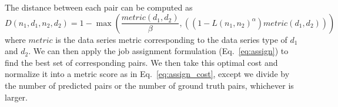\documentclass[a4paper,11pt]{scrartcl}
\begin{document}
The distance between each pair can be computed as
\begin{equation}
D(n_1, d_1, n_2, d_2) = 1 - \max(\frac{metric(d_1, d_2)}{\beta}, ((1 - L(n_1, n_2)^\alpha)metric(d_1, d_2)))
\end{equation}
where $metric$ is the data series metric corresponding to the data series type of $d_1$ and $d_2$.
We can then apply the job assignment formulation (Eq.~\ref{eq:assign}) to find the best set of corresponding pairs.
We then take this optimal cost and normalize it into a metric score as in Eq.~\ref{eq:assign_cost}, except we divide by the number of predicted pairs or the number of ground truth pairs, whichever is larger.
\end{document}
